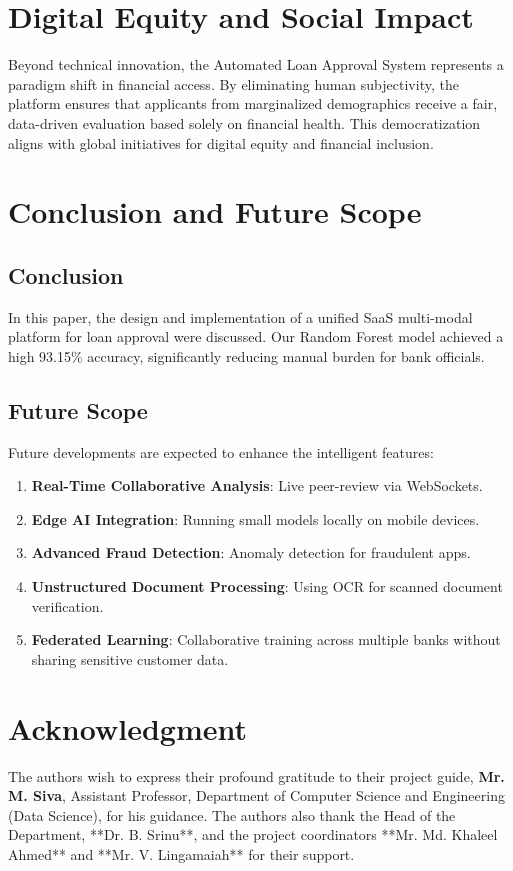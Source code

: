 \documentclass[conference]{IEEEtran}
\begin{document}
\section{Digital Equity and Social Impact}
Beyond technical innovation, the Automated Loan Approval System represents a paradigm shift in financial access. By eliminating human subjectivity, the platform ensures that applicants from marginalized demographics receive a fair, data-driven evaluation based solely on financial health. This democratization aligns with global initiatives for digital equity and financial inclusion.

\section{Conclusion and Future Scope}

\subsection{Conclusion}
In this paper, the design and implementation of a unified SaaS multi-modal platform for loan approval were discussed. Our Random Forest model achieved a high 93.15\% accuracy, significantly reducing manual burden for bank officials.

\subsection{Future Scope}
Future developments are expected to enhance the intelligent features:
\begin{enumerate}
    \item \textbf{Real-Time Collaborative Analysis}: Live peer-review via WebSockets.
    \item \textbf{Edge AI Integration}: Running small models locally on mobile devices.
    \item \textbf{Advanced Fraud Detection}: Anomaly detection for fraudulent apps.
    \item \textbf{Unstructured Document Processing}: Using OCR for scanned document verification.
    \item \textbf{Federated Learning}: Collaborative training across multiple banks without sharing sensitive customer data.
\end{enumerate}

\section*{Acknowledgment}
The authors wish to express their profound gratitude to their project guide, \textbf{Mr. M. Siva}, Assistant Professor, Department of Computer Science and Engineering (Data Science), for his guidance. The authors also thank the Head of the Department, **Dr. B. Srinu**, and the project coordinators **Mr. Md. Khaleel Ahmed** and **Mr. V. Lingamaiah** for their support.
\end{document}
